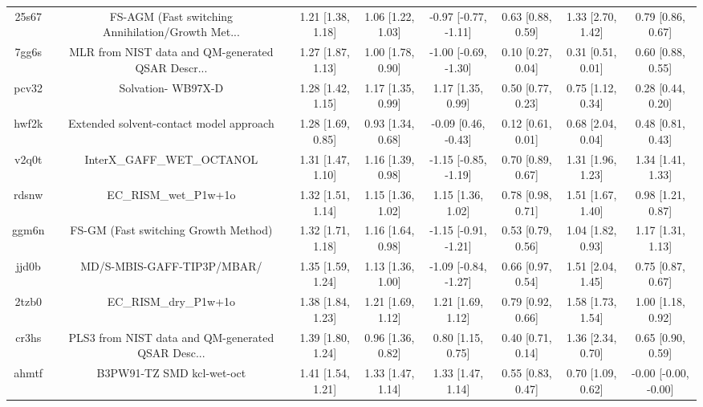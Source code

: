 \documentclass{article}
\begin{document}
\begin{center}
\begin{longtable}{|cccccccc|}
 25s67 &  FS-AGM (Fast switching Annihilation/Growth Met... &  1.21 [1.38, 1.18] &  1.06 [1.22, 1.03] &  -0.97 [-0.77, -1.11] &  0.63 [0.88, 0.59] &     1.33 [2.70, 1.42] &     0.79 [0.86, 0.67] \\
 7gg6s &  MLR from NIST data and QM-generated QSAR Descr... &  1.27 [1.87, 1.13] &  1.00 [1.78, 0.90] &  -1.00 [-0.69, -1.30] &  0.10 [0.27, 0.04] &     0.31 [0.51, 0.01] &     0.60 [0.88, 0.55] \\
 pcv32 &                                 Solvation- WB97X-D &  1.28 [1.42, 1.15] &  1.17 [1.35, 0.99] &     1.17 [1.35, 0.99] &  0.50 [0.77, 0.23] &     0.75 [1.12, 0.34] &     0.28 [0.44, 0.20] \\
 hwf2k &            Extended solvent-contact model approach &  1.28 [1.69, 0.85] &  0.93 [1.34, 0.68] &   -0.09 [0.46, -0.43] &  0.12 [0.61, 0.01] &     0.68 [2.04, 0.04] &     0.48 [0.81, 0.43] \\
 v2q0t &                         InterX\_GAFF\_WET\_OCTANOL &  1.31 [1.47, 1.10] &  1.16 [1.39, 0.98] &  -1.15 [-0.85, -1.19] &  0.70 [0.89, 0.67] &     1.31 [1.96, 1.23] &     1.34 [1.41, 1.33] \\
 rdsnw &                              EC\_RISM\_wet\_P1w+1o &  1.32 [1.51, 1.14] &  1.15 [1.36, 1.02] &     1.15 [1.36, 1.02] &  0.78 [0.98, 0.71] &     1.51 [1.67, 1.40] &     0.98 [1.21, 0.87] \\
 ggm6n &               FS-GM (Fast switching Growth Method) &  1.32 [1.71, 1.18] &  1.16 [1.64, 0.98] &  -1.15 [-0.91, -1.21] &  0.53 [0.79, 0.56] &     1.04 [1.82, 0.93] &     1.17 [1.31, 1.13] \\
 jjd0b &                         MD/S-MBIS-GAFF-TIP3P/MBAR/ &  1.35 [1.59, 1.24] &  1.13 [1.36, 1.00] &  -1.09 [-0.84, -1.27] &  0.66 [0.97, 0.54] &     1.51 [2.04, 1.45] &     0.75 [0.87, 0.67] \\
 2tzb0 &                              EC\_RISM\_dry\_P1w+1o &  1.38 [1.84, 1.23] &  1.21 [1.69, 1.12] &     1.21 [1.69, 1.12] &  0.79 [0.92, 0.66] &     1.58 [1.73, 1.54] &     1.00 [1.18, 0.92] \\
 cr3hs &  PLS3 from NIST data and QM-generated QSAR Desc... &  1.39 [1.80, 1.24] &  0.96 [1.36, 0.82] &     0.80 [1.15, 0.75] &  0.40 [0.71, 0.14] &     1.36 [2.34, 0.70] &     0.65 [0.90, 0.59] \\
 ahmtf &                          B3PW91-TZ SMD kcl-wet-oct &  1.41 [1.54, 1.21] &  1.33 [1.47, 1.14] &     1.33 [1.47, 1.14] &  0.55 [0.83, 0.47] &     0.70 [1.09, 0.62] &  -0.00 [-0.00, -0.00] \\

\end{longtable}
\end{center}
\end{document}
